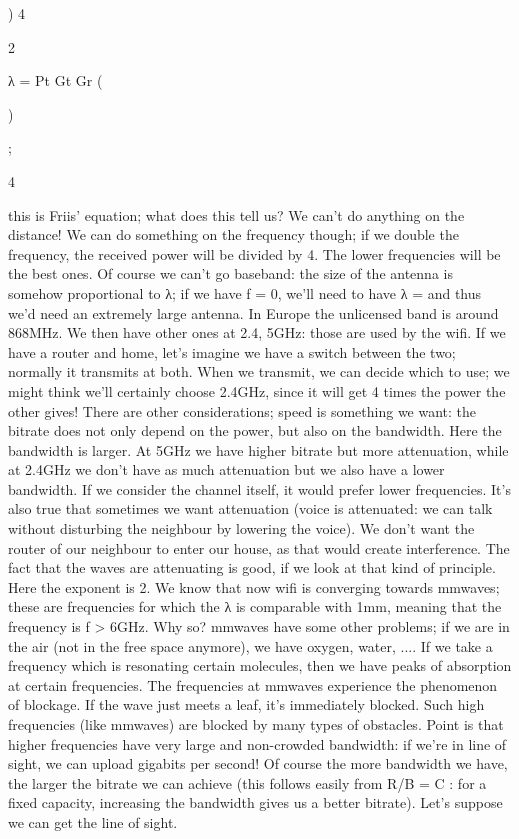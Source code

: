 {{{)
4\pi

2

λ
= Pt Gt Gr (

)

;

4\pid

this is Friis' equation; what does this tell us?
We can't do anything on the distance! We can do something on the frequency though; if we double the frequency, the received power will be divided by 4.
The lower frequencies will be the best ones. Of course we can't go baseband: the size of the antenna is somehow proportional to λ; if we have f = 0, we'll need to have λ = \infty and thus we'd need an extremely large antenna.
In Europe the unlicensed band is around 868MHz. We then have other ones at 2.4, 5GHz:
those are used by the wifi.
If we have a router and home, let's imagine we have a switch between the two;
normally it transmits at both. When we transmit, we can decide which to use; we might think we'll certainly choose 2.4GHz, since it will get 4 times the power the other gives!
There are other considerations; speed is something we want: the bitrate does not only depend on the power, but also on the bandwidth. Here the bandwidth is larger. At 5GHz we have higher bitrate but more attenuation, while at 2.4GHz we don't have as much attenuation but we also have a lower bandwidth.
If we consider the channel itself, it would prefer lower frequencies. It's also true that sometimes we want attenuation (voice is attenuated: we can talk without disturbing the neighbour by lowering the voice).
We don't want the router of our neighbour to enter our house, as that would create interference. The fact that the waves are attenuating is good, if we look at that kind of principle.
Here the exponent is 2.
We know that now wifi is converging towards mmwaves; these are frequencies for which the λ is comparable with 1mm, meaning that the frequency is f > 6GHz.
Why so? mmwaves have some other problems; if we are in the air (not in the free space anymore), we have oxygen, water, ....
If we take a frequency which is resonating certain molecules, then we have peaks of absorption at certain frequencies. The frequencies at mmwaves experience the phenomenon of blockage. If the wave just meets a leaf, it's immediately blocked. Such high frequencies (like mmwaves) are blocked by many types of obstacles.
Point is that higher frequencies have very large and non-crowded bandwidth: if we're in line of sight, we can upload gigabits per second!
Of course the more bandwidth we have, the larger the bitrate we can achieve (this follows easily from R/B = C : for a fixed capacity, increasing the bandwidth gives us a better bitrate).
Let's suppose we can get the line of sight.

}}}
